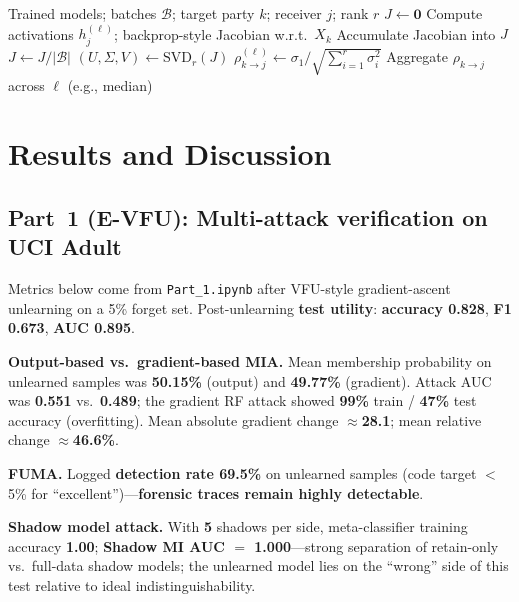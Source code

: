 \documentclass[sigconf,nonacm]{acmart}
\begin{document}
\begin{algorithm}[t]
\caption{Batch-averaged Jacobian $\rho$ for cross-party influence (sketch)}
\label{alg:jac}
\begin{algorithmic}[1]
\Require Trained models; batches $\mathcal{B}$; target party $k$; receiver $j$; rank $r$
  \State $J \gets \mathbf{0}$
    \State Compute activations $h_j^{(\ell)}$; backprop-style Jacobian w.r.t.\ $X_k$
    \State Accumulate Jacobian into $J$
  \EndFor
  \State $J \gets J / |\mathcal{B}|$
  \State $(U,\Sigma,V) \gets \mathrm{SVD}_r(J)$
  \State $\rho_{k\to j}^{(\ell)} \gets \sigma_1 / \sqrt{\sum_{i=1}^r \sigma_i^2}$
\EndFor
\State Aggregate $\rho_{k\to j}$ across $\ell$ (e.g., median)
\end{algorithmic}
\end{algorithm}



\section{Results and Discussion}
\label{sec:results}

\subsection{Part~1 (E-VFU): Multi-attack verification on UCI Adult}
Metrics below come from \texttt{Part\_1.ipynb} after VFU-style gradient-ascent unlearning on a 5\% forget set. Post-unlearning \textbf{test utility}: \textbf{accuracy 0.828}, \textbf{F1 0.673}, \textbf{AUC 0.895}.

\textbf{Output-based vs.\ gradient-based MIA.} Mean membership probability on unlearned samples was \textbf{50.15\%} (output) and \textbf{49.77\%} (gradient). Attack AUC was \textbf{0.551} vs.\ \textbf{0.489}; the gradient RF attack showed \textbf{99\%} train / \textbf{47\%} test accuracy (overfitting). Mean absolute gradient change $\approx$\textbf{28.1}; mean relative change $\approx$\textbf{46.6\%}.

\textbf{FUMA.} Logged \textbf{detection rate 69.5\%} on unlearned samples (code target $<$5\% for ``excellent'')---\textbf{forensic traces remain highly detectable}.

\textbf{Shadow model attack.} With \textbf{5} shadows per side, meta-classifier training accuracy \textbf{1.00}; \textbf{Shadow MI AUC $=$ 1.000}---strong separation of retain-only vs.\ full-data shadow models; the unlearned model lies on the ``wrong'' side of this test relative to ideal indistinguishability.
\end{document}
